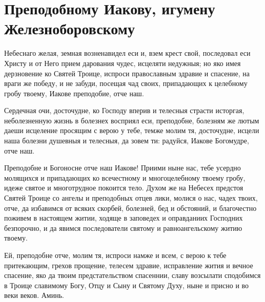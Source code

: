 \section{Преподобному Иакову, игумену Железноборовскому}\begin{mymulticols}


Небеснаго желая, земная возненавидел еси и, взем крест свой, последовал еси Христу и от Него прием дарования чудес, исцеляти недужныя; но яко имея дерзновение ко Святей Троице, испроси православным здравие и спасение, на враги же победу, и не забуди, посещая чад своих, припадающих к целебному гробу твоему, Иакове преподобие, отче наш.


Сердечная очи, досточудне, ко Господу вперив и телесныя страсти исторгая, неболезненную жизнь в болезнех восприял еси, преподобне, болезням же лютым даеши исцеление просящим с верою у тебе, темже молим тя, досточудне, исцели наша болезни душевныя и телесныя, да зовем ти: радуйся, Иакове Богомудре, отче наш.


Преподобне и Богоносне отче наш Иакове! Приими ныне нас, тебе усердно молящихся и припадающих ко всечестному и многоцелебному твоему гробу, идеже святое и многотрудное покоится тело. Духом же на Небесех предстоя Святей Троице со ангелы и преподобных отцев лики, молися о нас, чадех твоих, отче, да избавимся от всяких скорбей, болезней, бед и обстояний, и благочестно поживем в настоящем житии, ходяще в заповедех и оправданиих Господних безпорочно, и да явимся последователи святому и равноангельскому житию твоему. 

Ей, преподобне отче, молим тя, испроси намже и всем, с верою к тебе притекающим, грехов прощение, телесем здравие, исправление жития и вечное спасение, яко да твоим предстательством спасеннии, славу возсылати сподобимся в Троице славимому Богу, Отцу и Сыну и Святому Духу, ныне и присно и во веки веков. Аминь.

\end{mymulticols}

\mychapterending



